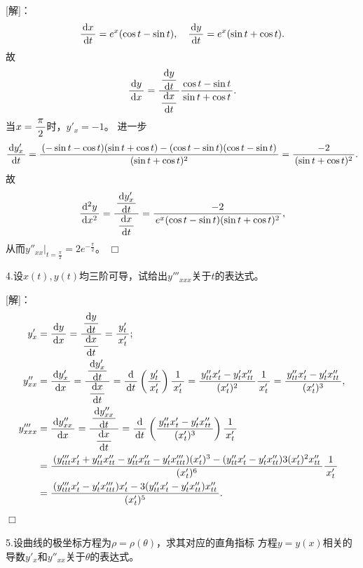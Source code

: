[解]：
$$\df{\d x}{\d t}=e^x(\cos t-\sin t),\quad
\df{\d y}{\d t}=e^x(\sin t+\cos t).$$
故
$$\df{\d y}{\d x}=\df{\df{\d y}{\d t}}{\df{\d x}{\d t}}
\df{\cos t-\sin t}{\sin t+\cos t}.$$
当$x=\df{\pi}2$时，$y'_x=-1$。
进一步
$$\df{\d y'_x}{\d t}=\df{(-\sin t-\cos t)(\sin t+\cos t)
-(\cos t-\sin t)(\cos t-\sin t)}{(\sin t+\cos t)^2}
=\df{-2}{(\sin t+\cos t)^2}.$$
故
$$\df{\d^2 y}{\d x^2}
=\df{\df{\d y'_x}{\d t}}{\df{\d x}{\d t}}
=\df{-2}{e^x(\cos t-\sin t)(\sin t+\cos t)^2},$$
从而$y''_{xx}|_{t=\frac{\pi}2}=2e^{-\frac{\pi}2}$。
\hfill$\Box$

\bigskip

4.设$x(t),y(t)$均三阶可导，试给出$y'''_{xxx}$关于$t$的表达式。

[解]：
\begin{align*}
	y'_x&=\df{\d y}{\d x}=\df{\df{\d y}{\d t}}{\df{\d x}{\d t}}
	=\df{y'_t}{x'_t};\\
	y''_{xx}&=\df{\d y'_x}{\d x}=\df{\df{\d y'_x}{\d t}}{\df{\d x}{\d t}}
	=\df{\d }{\d t}\left(\df{y'_t}{x'_t}\right)\df{1}{x'_t}
	=\df{y''_{tt}x'_t-y'_tx''_{tt}}{(x'_t)^2}\df{1}{x'_t}
	=\df{y''_{tt}x'_t-y'_tx''_{tt}}{(x'_t)^3},\\
	y'''_{xxx}&=\df{\d y''_{xx}}{\d x}=\df{\df{\d y''_{xx}}{\d t}}{\df{\d x}{\d t}}
	=\df{\d }{\d t}\left(\df{y''_{tt}x'_t-y'_tx''_{tt}}{(x'_t)^3}\right)
	\df{1}{x'_t}\\
	&=\df{(y'''_{ttt}x'_t+y''_{tt}x''_{tt}
	-y''_{tt}x''_{tt}-y'_tx'''_{ttt})(x'_t)^3
	-(y''_{tt}x'_t-y'_tx''_{tt})3(x'_t)^2x''_{tt}}{(x'_t)^6}\df{1}{x'_t}\\
	&=\df{(y'''_{ttt}x'_t-y'_tx'''_{ttt})x'_t
	-3(y''_{tt}x'_t-y'_tx''_{tt})x''_{tt}}{(x'_t)^5}.
\end{align*}
\hfill$\Box$

\bigskip

5.设曲线的极坐标方程为$\rho=\rho(\theta)$，求其对应的直角指标
方程$y=y(x)$相关的导数$y'_x$和$y''_{xx}$关于$\theta$的表达式。

